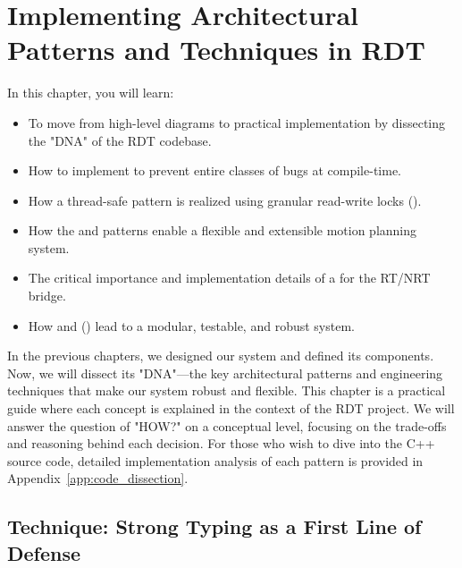 
\chapter{Implementing Architectural Patterns and Techniques in RDT}
\label{chap:implementation_patterns_conceptual}


\begin{navigationbox}{In this chapter, you will learn:}
    \begin{itemize}
        \item To move from high-level diagrams to practical implementation by dissecting the "DNA" of the RDT codebase.
        \item How to implement  to prevent entire classes of bugs at compile-time.
        \item How a thread-safe  pattern is realized using granular read-write locks ().
        \item How the  and  patterns enable a flexible and extensible motion planning system.
        \item The critical importance and implementation details of a  for the RT/NRT bridge.
        \item How  and  () lead to a modular, testable, and robust system.
    \end{itemize}
\end{navigationbox}

In the previous chapters, we designed our system and defined its components. Now, we will dissect its "DNA"—the key architectural patterns and engineering techniques that make our system robust and flexible. This chapter is a practical guide where each concept is explained in the context of the RDT project. We will answer the question of "HOW?" on a conceptual level, focusing on the trade-offs and reasoning behind each decision. For those who wish to dive into the C++ source code, detailed implementation analysis of each pattern is provided in Appendix~\ref{app:code_dissection}.

\section{Technique: Strong Typing as a First Line of Defense}
\label{sec:strong_typing_conceptual}

